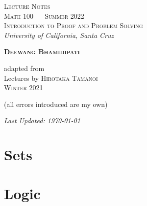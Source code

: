 
 

 
 
\begin{titlepage}
    \centering
    \vspace*{\fill}

	\vspace{-2in}

    {\Huge
    \textsc{Lecture Notes}}\\

    \vspace{0.1in}
	{\Large
	\textsc{Math 100 --- Summer 2022\\[0.5em] Introduction to Proof and Problem Solving}}\\
	\vspace{0.5in}
    {\Large
    \textsl{University of California, Santa Cruz}}
	
    \vspace*{0.5in}

	{\LARGE    
    \textbf{\textsc{Deewang Bhamidipati}}%
    }
	
    \vspace*{0.5in}

	{{\large adapted from}\\[0.1em]
	\Large    
    Lectures by
	\textsc{Hirotaka Tamanoi}\\[0.1em]
	{\normalsize\textsc{Winter 2021}}

	\vspace*{0.2in}	
	{\large
	(all errors introduced are my own)}
	}

	\vspace*{\fill}
	{\normalsize    
    \textsl{Last Updated: \today}}
    \end{titlepage}
    
\tableofcontents
\pagebreak

\section{Sets}

\newpage

\section{Logic}

\newpage

